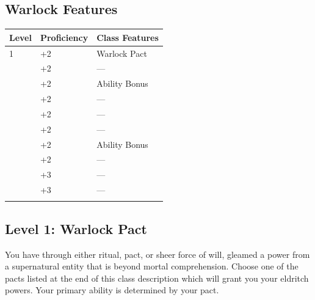 \documentclass[12pt,letterpaper,twocolumn,openany,nodeprecatedcode,bg=none]{dndbook}
\let\oldsubsection\subsection
\renewcommand{\subsection}[1]{%
  \needspace{5\baselineskip}%
  \oldsubsection{#1}%
}
\begin{document}
\subsection{Warlock Features}\label{warlock-features}


{\def\LTcaptype{none} %
\begin{table}[!htbp]
\centering
\begin{tabular}{@{}
  >{\raggedright\arraybackslash}p{}
  >{\raggedright\arraybackslash}p{}
  >{\raggedright\arraybackslash}p{}@{}}
\toprule\noalign{}
\begin{minipage}[b]{\linewidth}\raggedright
Level
\end{minipage} & \begin{minipage}[b]{\linewidth}\raggedright
Proficiency
\end{minipage} & \begin{minipage}[b]{\linewidth}\raggedright
Class Features
\end{minipage} \\
\midrule\noalign{}
1 & +2 & Warlock Pact \\
2 & +2 & --- \\
3 & +2 & Ability Bonus \\
4 & +2 & --- \\
5 & +2 & --- \\
6 & +2 & --- \\
7 & +2 & Ability Bonus \\
8 & +2 & --- \\
9 & +3 & --- \\
10 & +3 & --- \\
\bottomrule\noalign{}
\end{tabular}
\end{table}
}

\subsection{Level 1: Warlock Pact}\label{level-1-warlock-pact}

You have through either ritual, pact, or sheer force of will, gleamed a
power from a supernatural entity that is beyond mortal comprehension.
Choose one of the pacts listed at the end of this class description
which will grant you your eldritch powers. Your primary ability is
determined by your pact.
\end{document}
